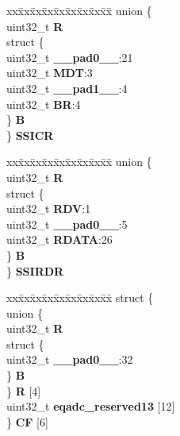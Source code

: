 \begin{DoxyCompactItemize}
\begin{tabbing}
\end{tabbing}\item 
\mbox{\label{structEQADC__tag_ab8d0412bc2c4f6d2d65fc79b801a0d06}} 
\begin{tabbing}
xx\=xx\=xx\=xx\=xx\=xx\=xx\=xx\=xx\=\kill
union \{\\
\>uint32\_t {\bfseries R}\\
\>struct \{\\
\>\>uint32\_t {\bfseries \_\_pad0\_\_}:21\\
\>\>uint32\_t {\bfseries MDT}:3\\
\>\>uint32\_t {\bfseries \_\_pad1\_\_}:4\\
\>\>uint32\_t {\bfseries BR}:4\\
\>\} {\bfseries B}\\
\} {\bfseries SSICR}\\

\end{tabbing}\item 
\mbox{\label{structEQADC__tag_a39dd27d1777b82dfcece60d1c953ae70}} 
\begin{tabbing}
xx\=xx\=xx\=xx\=xx\=xx\=xx\=xx\=xx\=\kill
union \{\\
\>uint32\_t {\bfseries R}\\
\>struct \{\\
\>\>uint32\_t {\bfseries RDV}:1\\
\>\>uint32\_t {\bfseries \_\_pad0\_\_}:5\\
\>\>uint32\_t {\bfseries RDATA}:26\\
\>\} {\bfseries B}\\
\} {\bfseries SSIRDR}\\

\end{tabbing}\item 
\mbox{\label{structEQADC__tag_a40cb698743eb8917c6e70d00afb3204e}} 
\begin{tabbing}
xx\=xx\=xx\=xx\=xx\=xx\=xx\=xx\=xx\=\kill
struct \{\\
\>union \{\\
\>\>uint32\_t {\bfseries R}\\
\>\>struct \{\\
\>\>\>uint32\_t {\bfseries \_\_pad0\_\_}:32\\
\>\>\} {\bfseries B}\\
\>\} {\bfseries R} \mbox{[}4\mbox{]}\\
\>uint32\_t {\bfseries eqadc\_reserved13} \mbox{[}12\mbox{]}\\
\} {\bfseries CF} \mbox{[}6\mbox{]}\\


\end{tabbing}
\end{DoxyCompactItemize}
